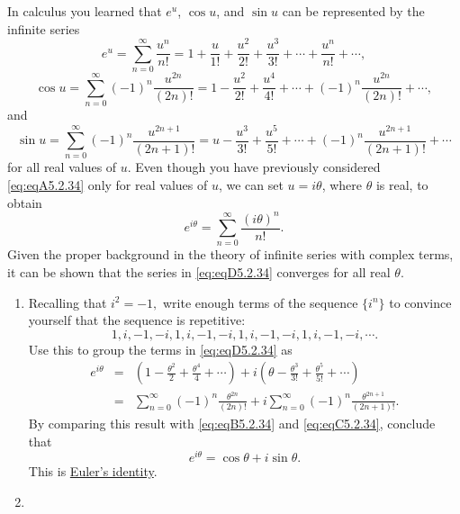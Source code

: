 \documentclass{ximera}
\begin{document}
\begin{problem}\label{exer:5.2.34}
In calculus you learned that $e^u$, $\cos u$, and $\sin u$
can be represented by the infinite series \begin{equation}\label{eq:eqA5.2.34}
e^u=\sum_{n=0}^\infty \frac{u^n}{n!}
=1+\frac{u}{1!}+\frac{u^2}{2!}+\frac{u^3}{3!}+\cdots+\frac{u^n}{n!}+\cdots,
\end{equation}
\begin{equation}\label{eq:eqB5.2.34}
\cos u=\sum_{n=0}^\infty (-1)^n\frac{u^{2n}}{(2n)!}
=1-\frac{u^2}{2!}+\frac{u^4}{4!}+\cdots+(-1)^n\frac{u^{2n}}{(2n)!}
+\cdots,
\end{equation}
and \begin{equation}\label{eq:eqC5.2.34}
\sin u=\sum_{n=0}^\infty (-1)^n\frac{u^{2n+1}}{(2n+1)!}
=u-\frac{u^3}{3!}+\frac{u^5}{5!}+\cdots+(-1)^n
\frac{u^{2n+1}}{(2n+1)!}
+\cdots
\end{equation}
for all real values of $u$.
Even though you have previously considered \ref{eq:eqA5.2.34}
only for real values of $u$, we can set $u=i\theta$, where $\theta$ is
real, to obtain \begin{equation}\label{eq:eqD5.2.34}
e^{i\theta}=\sum_{n=0}^\infty \frac{(i\theta)^n}{n!}.
\end{equation}
Given the proper background in the theory of infinite series with
complex terms, it can be shown that the series in
\ref{eq:eqD5.2.34} converges for all real $\theta$.
\begin{enumerate}
\item %
Recalling that $i^2=-1,$
write enough  terms of the sequence $\{i^n\}$ to convince yourself
that the sequence is repetitive:
$$
1,i,-1,-i,1,i,-1,-i,1,i,-1,-i,1,i,-1,-i,\cdots.
$$
Use this to group the terms in \ref{eq:eqD5.2.34} as
\begin{eqnarray*}
e^{i\theta}&=&\left(1-\frac{\theta^2}{2}+\frac{\theta^4}{4}+\cdots\right)
+i\left(\theta-\frac{\theta^3}{3!}+\frac{\theta^5}{5!}+\cdots\right) \\
&=&\sum_{n=0}^\infty (-1)^n\frac{\theta^{2n}}{(2n)!}
+i\sum_{n=0}^\infty (-1)^n\frac{\theta^{2n+1}}{(2n+1)!}.
\end{eqnarray*}
By comparing this result with \ref{eq:eqB5.2.34} and
\ref{eq:eqC5.2.34}, conclude that \begin{equation}\label{eq:eqE5.2.34}
e^{i\theta}=\cos\theta+i\sin\theta.
\end{equation}
This is
\href{http://www-history.mcs.st-and.ac.uk/Mathematicians/Euler.html}
{Euler's identity}.
\item %

\end{enumerate}
\end{problem}
\end{document}
